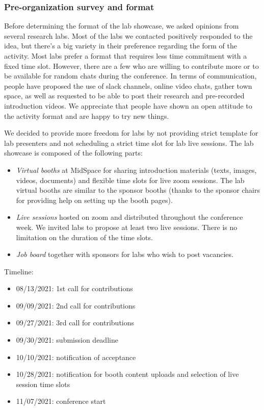 \documentclass[%
10pt,								%
titlepage,						%
]
{scrartcl}
\begin{document}
        \subsubsection{Pre-organization survey and format}
            Before determining the format of the lab showcase, we asked opinions from several research labs. Most of the labs we contacted positively responded to the idea, but there's a big variety in their preference regarding the form of the activity. Most labs prefer a format that requires less time commitment with a fixed time slot. However, there are a few who are willing to contribute more or to be available for random chats during the conference. In terms of communication, people have proposed the use of slack channels, online video chats, gather town space, as well as requested to be able to post their research and pre-recorded introduction videos. We appreciate that people have shown an open attitude to the activity format and are happy to try new things.
            
We decided to provide more freedom for labs by not providing strict template for lab presenters and not scheduling a strict time slot for lab live sessions. The lab showcase is composed of the following parts:
            \begin{itemize}
                \item \textit{Virtual booths} at MidSpace for sharing introduction materials (texts, images, videos, documents) and flexible time slots for live zoom sessions. The lab virtual booths are similar to the sponsor booths (thanks to the sponsor chairs for providing help on setting up the booth pages).
                \item \textit{Live sessions} hosted on zoom and distributed throughout the conference week. We invited labs to propose at least two live sessions. There is no limitation on the duration of the time slots.
                \item \textit{Job board} together with sponsors for labs who wish to post vacancies.
            \end{itemize}
            
            Timeline:
            \begin{itemize}
                \item   08/13/2021: 1st call for contributions
                \item   09/09/2021: 2nd call for contributions
                \item   09/27/2021: 3rd call for contributions
                \item   09/30/2021: submission deadline
                \item   10/10/2021: notification of acceptance
                \item   10/28/2021: notification for booth content uploads and selection of live session time slots
                \item   11/07/2021: conference start
            \end{itemize}
            
\end{document}
